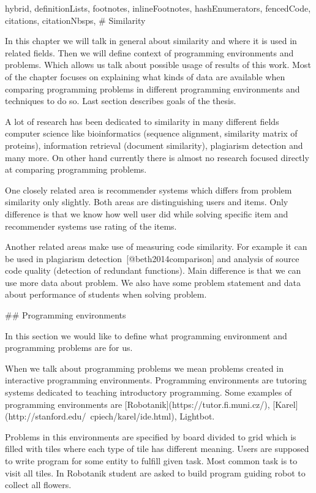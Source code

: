 \documentclass[
  digital, %
  table,   %
  nolof,     %
  nolot,     %
  nocover
]{fithesis3}
\begin{document}
\begin{markdown*}{%
  hybrid,
  definitionLists,
  footnotes,
  inlineFootnotes,
  hashEnumerators,
  fencedCode,
  citations,
  citationNbsps,
}
# Similarity

In this chapter we will talk in general about similarity and where it is used in related fields. Then we will define context of programming environments and problems. Which allows us talk about possible usage of results of this work. Most of the chapter focuses on explaining what kinds of data are available when comparing programming problems in different programming environments and techniques to do so. Last section describes goals of the thesis.

A lot of research has been dedicated to similarity in many different fields computer science like bioinformatics (sequence alignment, similarity matrix of proteins), information retrieval (document similarity), plagiarism detection and many more. On other hand currently there is almost no research focused directly at comparing programming problems.

One closely related area is recommender systems which differs from problem similarity only slightly. Both areas are distinguishing users and items. Only difference is that we know how well user did while solving specific item and recommender systems use rating of the items.

Another related areas make use of measuring code similarity. For example it can be used in plagiarism detection~[@beth2014comparison] and analysis of source code quality (detection of redundant functions). Main difference is that we can use more data about problem. We also have some problem statement and data about performance of students when solving problem.

## Programming environments

In this section we would like to define what programming environment and programming problems are for us.

When we talk about programming problems we mean problems created in interactive programming environments. Programming environments are tutoring systems dedicated to teaching introductory programming. Some examples of programming environments are [Robotanik](https://tutor.fi.muni.cz/), [Karel](http://stanford.edu/~cpiech/karel/ide.html), Lightbot.

Problems in this environments are specified by board divided to grid which is filled with tiles where each type of tile has different meaning. Users are supposed to write program for some entity to fulfill given task. Most common task is to visit all  tiles. In Robotanik student are asked to build program guiding robot to collect all flowers.


\end{markdown*}
\end{document}
